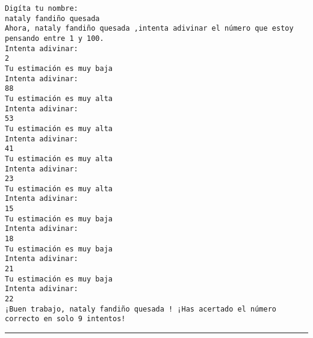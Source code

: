 \documentclass[11pt]{article}
\begin{document}
    \begin{Verbatim}[commandchars=\\\{\}]
Digíta tu nombre: 
nataly fandiño quesada 
Ahora, nataly fandiño quesada ,intenta adivinar el número que estoy pensando entre 1 y 100. 
Intenta adivinar: 
2
Tu estimación es muy baja
Intenta adivinar: 
88
Tu estimación es muy alta
Intenta adivinar: 
53
Tu estimación es muy alta
Intenta adivinar: 
41
Tu estimación es muy alta
Intenta adivinar: 
23
Tu estimación es muy alta
Intenta adivinar: 
15
Tu estimación es muy baja
Intenta adivinar: 
18
Tu estimación es muy baja
Intenta adivinar: 
21
Tu estimación es muy baja
Intenta adivinar: 
22
¡Buen trabajo, nataly fandiño quesada ! ¡Has acertado el número correcto en solo 9 intentos!

    \end{Verbatim}

    \begin{center}\rule{0.5\linewidth}{\linethickness}\end{center}


    
    
    
    
\end{document}
